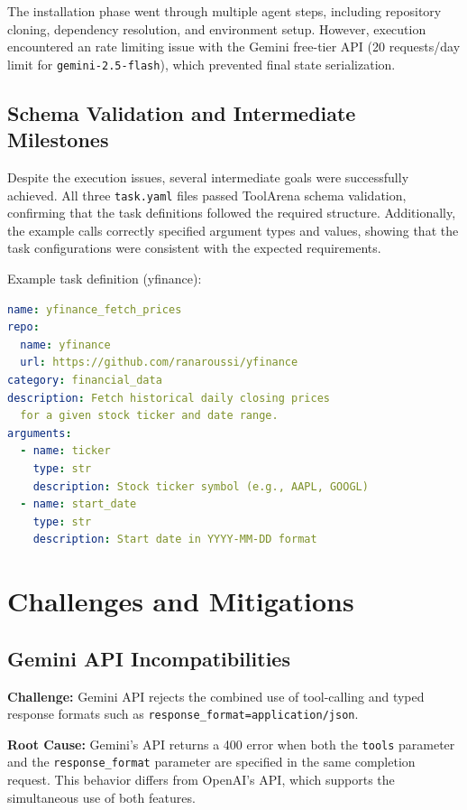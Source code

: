 \documentclass[11pt]{article}
\begin{document}
The installation phase went through multiple agent steps, including repository cloning, dependency resolution, and environment setup. However, execution encountered an rate limiting issue with the Gemini free-tier API (20 requests/day limit for \texttt{gemini-2.5-flash}), which prevented final state serialization.

\subsection{Schema Validation and Intermediate Milestones}

Despite the execution issues, several intermediate goals were successfully achieved. All three \texttt{task.yaml} files passed ToolArena schema validation, confirming that the task definitions followed the required structure. Additionally, the example calls correctly specified argument types and values, showing that the task configurations were consistent with the expected requirements.


Example task definition (yfinance):
\begin{lstlisting}[language=yaml]
name: yfinance_fetch_prices
repo:
  name: yfinance
  url: https://github.com/ranaroussi/yfinance
category: financial_data
description: Fetch historical daily closing prices 
  for a given stock ticker and date range.
arguments:
  - name: ticker
    type: str
    description: Stock ticker symbol (e.g., AAPL, GOOGL)
  - name: start_date
    type: str
    description: Start date in YYYY-MM-DD format
\end{lstlisting}

\section{Challenges and Mitigations}

\subsection{Gemini API Incompatibilities}

\textbf{Challenge:} Gemini API rejects the combined use of tool-calling and typed response formats such as \texttt{response\_format=application/json}.

\textbf{Root Cause:} Gemini's API returns a 400 error when both the \texttt{tools} parameter and the \texttt{response\_format} parameter are specified in the same completion request. This behavior differs from OpenAI's API, which supports the simultaneous use of both features.
\end{document}
